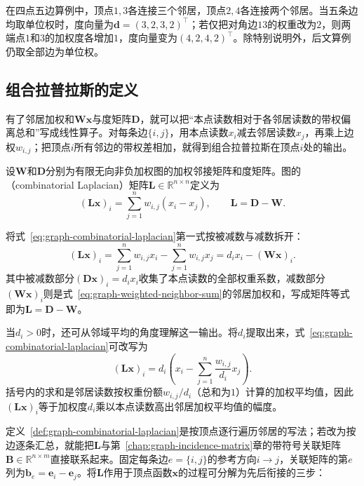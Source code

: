 在四点五边算例中，顶点$1,3$各连接三个邻居，顶点$2,4$各连接两个邻居。当五条边均取单位权时，度向量为$\bm d=(3,2,3,2)^\top$；若仅把对角边$13$的权重改为$2$，则两端点$1$和$3$的加权度各增加$1$，度向量变为$(4,2,4,2)^\top$。除特别说明外，后文算例仍取全部边为单位权。

\subsection{组合拉普拉斯的定义}
\label{sec:graph-laplacian-matrix-form}

有了邻居加权和$\bm W\bm x$与度矩阵$\bm D$，就可以把“本点读数相对于各邻居读数的带权偏离总和”写成线性算子。对每条边$\{i,j\}$，用本点读数$x_i$减去邻居读数$x_j$，再乘上边权$w_{i,j}$；把顶点$i$所有邻边的带权差相加，就得到组合拉普拉斯在顶点$i$处的输出。

\begin{definition}[组合拉普拉斯矩阵]
\label{def:graph-combinatorial-laplacian}
设$\bm W$和$\bm D$分别为有限无向非负加权图的加权邻接矩阵和度矩阵。图的（combinatorial Laplacian）矩阵$\bm L\in\mathbb R^{n\times n}$定义为
\begin{equation}
  (\bm L\bm x)_i=\sum_{j=1}^n w_{i,j}(x_i-x_j),\qquad
  \bm L=\bm D-\bm W.
  \label{eq:graph-combinatorial-laplacian}
\end{equation}
\end{definition}

将式~\eqref{eq:graph-combinatorial-laplacian}第一式按被减数与减数拆开：
\[
  (\bm L\bm x)_i
  =\sum_{j=1}^n w_{i,j}x_i - \sum_{j=1}^n w_{i,j}x_j
  =d_i x_i - (\bm W\bm x)_i.
\]
其中被减数部分$(\bm D\bm x)_i=d_i x_i$收集了本点读数的全部权重系数，减数部分$(\bm W\bm x)_i$则是式~\eqref{eq:graph-weighted-neighbor-sum}的邻居加权和，写成矩阵等式即为$\bm L=\bm D-\bm W$。

当$d_i>0$时，还可从邻域平均的角度理解这一输出。将$d_i$提取出来，式~\eqref{eq:graph-combinatorial-laplacian}可改写为
\[
  (\bm L\bm x)_i = d_i\left(x_i - \sum_{j=1}^n \frac{w_{i,j}}{d_i}x_j\right).
\]
括号内的求和是邻居读数按权重份额$w_{i,j}/d_i$（总和为$1$）计算的加权平均值，因此$(\bm L\bm x)_i$等于加权度$d_i$乘以本点读数高出邻居加权平均值的幅度。

定义~\ref{def:graph-combinatorial-laplacian}是按顶点逐行遍历邻居的写法；若改为按边逐条汇总，就能把$\bm L$与第~\ref{chap:graph-incidence-matrix}章的带符号关联矩阵$\bm B\in\mathbb R^{n\times m}$直接联系起来。固定每条边$e=\{i,j\}$的参考方向$i\to j$，关联矩阵的第$e$列为$\bm b_e=\bm e_i-\bm e_j$。将$\bm L$作用于顶点函数$\bm x$的过程可分解为先后衔接的三步：

